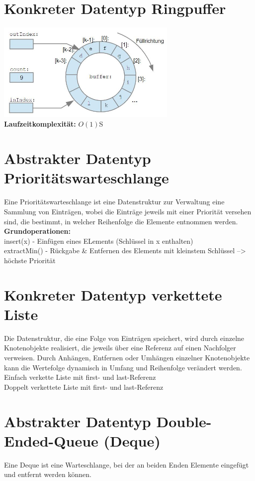 \documentclass{scrreprt}
\begin{document}
\section{Konkreter Datentyp Ringpuffer}
\includegraphics[width=0.65\textwidth]{graphics/Ringpuffer}
\\\textbf{Laufzeitkomplexität:} $O(1)$S
\section{Abstrakter Datentyp Prioritätswarteschlange}
Eine Prioritätswarteschlange ist eine Datenstruktur zur Verwaltung eine Sammlung von Einträgen,
wobei die Einträge jeweils mit einer Priorität versehen sind, die bestimmt, in welcher
Reihenfolge die Elemente entnommen werden.
\\\textbf{Grundoperationen:}
\\ insert(x) - Einfügen eines ELements (Schlüssel in x enthalten)
\\ extractMin() - Rückgabe \& Entfernen des Elements mit kleinstem Schlüssel --> höchste Priorität
\section{Konkreter Datentyp verkettete Liste}
Die Datenstruktur, die eine Folge von Einträgen speichert, wird durch einzelne Knotenobjekte realisiert, die
jeweils über eine Referenz auf einen Nachfolger verweisen. Durch Anhängen,
Entfernen oder Umhängen einzelner Knotenobjekte kann die Wertefolge dynamisch in
Umfang und Reihenfolge verändert werden.
\\ Einfach verkette Liste mit first- und last-Referenz
\\ Doppelt verkettete Liste mit first- und last-Referenz
\section{Abstrakter Datentyp Double-Ended-Queue (Deque)}
Eine Deque ist eine Warteschlange, bei der an beiden Enden Elemente eingefügt und entfernt werden können.
\end{document}
